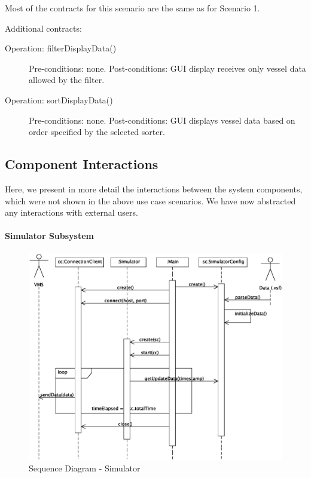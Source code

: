 \documentclass{article}
\begin{document}
Most of the contracts for this scenario are the same as for Scenario 1.

Additional contracts:

\begin{description}
    \item[Operation: filterDisplayData()] Pre-conditions: none.\newline
  Post-conditions: GUI display receives only vessel data allowed by the filter.
    \item[Operation: sortDisplayData()] Pre-conditions: none.\newline
  Post-conditions: GUI displays vessel data based on order specified by the selected sorter.
\end{description}

\subsection{Component Interactions}

Here, we present in more detail the interactions between the system components, which were not shown in the above use case scenarios. We have now abstracted any interactions with external users.

\paragraph{Simulator Subsystem}

\begin{figure}[!htb]
\caption{Sequence Diagram - Simulator}
\centering
\includegraphics[scale=0.6]{diagrams/simulator-sequence-diagram.eps}
\end{figure}
\end{document}
